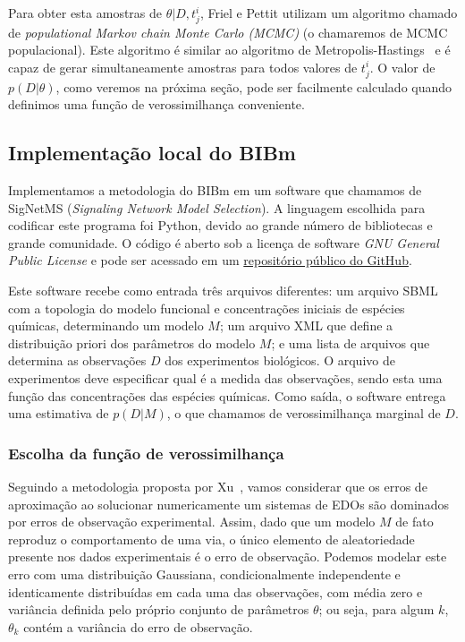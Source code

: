 \documentclass[12pt]{article}
\begin{document}
Para obter esta amostras de $\theta | D, t^i_j$, Friel e Pettit utilizam 
um algoritmo chamado de {\em populational Markov chain Monte Carlo (MCMC)} 
(o chamaremos de MCMC populacional). Este algoritmo é similar ao
algoritmo de Metropolis-Hastings~\cite{BayesianDataAnalysis} e é capaz
de gerar simultaneamente amostras para todos valores de $t^i_j$. O valor
de $p (D | \theta)$, como veremos na próxima seção, pode ser facilmente
calculado quando definimos uma função de verossimilhança conveniente.

\subsection{Implementação local do BIBm}
Implementamos a metodologia do BIBm em um software que chamamos de 
SigNetMS ({\em Signaling Network Model Selection}). A linguagem 
escolhida para codificar este programa foi Python, devido ao grande 
número de bibliotecas e grande comunidade. O código é aberto sob a 
licença de software {\em GNU General Public License} e pode ser acessado 
em um \href{https://github.com/gustavoem/SigNetMS}{repositório público 
do GitHub}.

Este software recebe como entrada três arquivos diferentes: um arquivo 
SBML~\cite{hucka2003systems} com a topologia do modelo funcional e 
concentrações iniciais de espécies químicas, determinando um modelo $M$; 
um arquivo XML que define a distribuição priori dos parâmetros do modelo 
$M$; e uma lista de arquivos que determina as observações $D$ dos 
experimentos biológicos. O arquivo de experimentos deve especificar qual 
é a medida das observações, sendo esta uma função das concentrações das 
espécies químicas. Como saída, o software entrega uma estimativa de 
$p (D | M)$, o que chamamos de verossimilhança marginal de $D$.

\subsubsection{Escolha da função de verossimilhança}
Seguindo a metodologia proposta por Xu~\cite{Xu2010}, vamos considerar
que os erros de aproximação ao solucionar numericamente um sistemas de
EDOs são dominados por erros de observação experimental. Assim, dado que
um modelo $M$ de fato reproduz o comportamento de uma via, o único 
elemento de aleatoriedade presente nos dados experimentais é o erro de 
observação. Podemos modelar este erro com uma distribuição Gaussiana,
condicionalmente independente e identicamente distribuídas em cada uma 
das observações, com média zero e variância definida pelo próprio 
conjunto de parâmetros $\theta$; ou seja, para algum $k$, 
$\theta_{k}$ contém a variância do erro de observação. 
\end{document}
